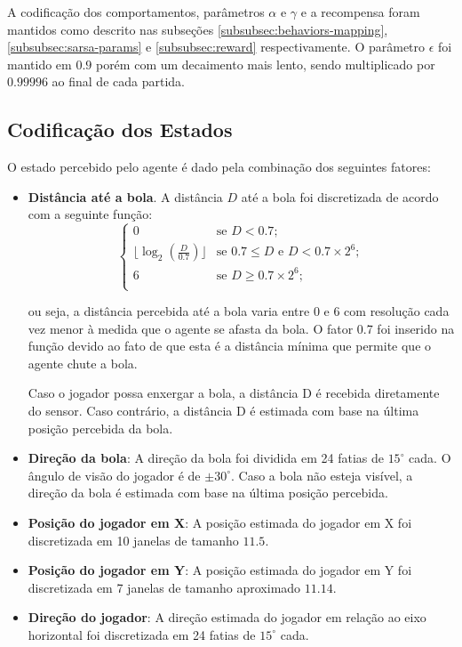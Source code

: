A codificação dos comportamentos, parâmetros $\alpha$ e $\gamma$ e a recompensa foram mantidos como descrito nas subseções \ref{subsubsec:behaviors-mapping}, \ref{subsubsec:sarsa-params} e \ref{subsubsec:reward} respectivamente. O parâmetro $\epsilon$ foi mantido em $0.9$ porém com um decaimento mais lento, sendo multiplicado por $0.99996$ ao final de cada partida.

\subsection{Codificação dos Estados}
\label{subsubsec:state-encoding}

O estado percebido pelo agente é dado pela combinação dos seguintes fatores:

\begin{itemize}
	\item \textbf{Distância até a bola}. A distância $D$ até a bola foi discretizada de acordo com a seguinte função:
	\begin{equation}
		\label{eq:balldist}
		\left\{
		\begin{array}{ll}
			0  & \mbox{se } D < 0.7; \\
			\lfloor\log_2 (\frac{D}{0.7})\rfloor & \mbox{se } 0.7 \leq D \mbox{ e } D < 0.7 \times 2^6; \\
			6  & \mbox{se } D \geq 0.7 \times 2^6; \\
		\end{array}
		\right.
	\end{equation}
	
	ou seja, a distância percebida até a bola varia entre 0 e 6 com resolução cada vez menor à medida que o agente se afasta da bola. O fator 0.7 foi inserido na função devido ao fato de que esta é a distância mínima que permite que o agente chute a bola.
	
	Caso o jogador possa enxergar a bola, a distância D é recebida diretamente do sensor. Caso contrário, a distância D é estimada com base na última posição percebida da bola.
	
	\item \textbf{Direção da bola}: A direção da bola foi dividida em 24 fatias de $15^{\circ}$ cada. O ângulo de visão do jogador é de $\pm30^{\circ}$. Caso a bola não esteja visível, a direção da bola é estimada com base na última posição percebida.
	
	\item \textbf{Posição do jogador em X}: A posição estimada do jogador em X foi discretizada em 10 janelas de tamanho $11.5$.
	
	\item \textbf{Posição do jogador em Y}: A posição estimada do jogador em Y foi discretizada em 7 janelas de tamanho aproximado $11.14$.
	
	\item \textbf{Direção do jogador}: A direção estimada do jogador em relação ao eixo horizontal foi discretizada em 24 fatias de $15^{\circ}$ cada.
	
\end{itemize}

